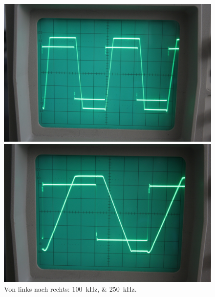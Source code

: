 \begin{figure}[htbp]
	\centering
	\begin{minipage}{.45\linewidth}
		\includegraphics[width=\linewidth]{Oszi_Foto/5-807.jpg}
	\end{minipage}
	\hfill
	\begin{minipage}{.45\linewidth}
		\includegraphics[width=\linewidth]{Oszi_Foto/5-808.jpg}
	\end{minipage}
	\caption{%
		Von links nach rechts: \SIlist{100;250}{\kilo\hertz}.
	}
	\label{fig:807}
\end{figure}


